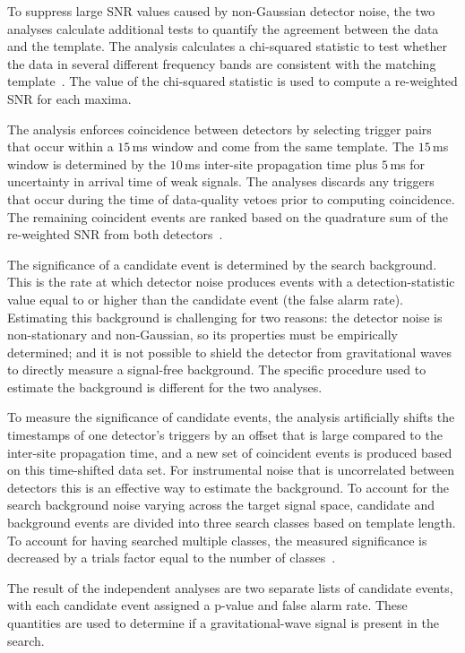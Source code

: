 To suppress large SNR values caused by non-Gaussian detector noise, the two
analyses calculate additional tests to quantify the agreement between the data
and the template.  The \pycbc{} analysis calculates a chi-squared statistic to
test whether the data in several different frequency bands are consistent with
the matching template~\cite{Allen:2004gu}.  The value of the chi-squared
statistic is used to compute a re-weighted SNR for each maxima.

The \pycbc{} analysis enforces coincidence between detectors by selecting trigger pairs
that occur within a $15\,$ms window and come from the same template.  The
$15\,$ms window is determined by the $10\,$ms inter-site propagation time plus
$5\,$ms for uncertainty in arrival time of weak signals.  The \pycbc{}
analyses discards any triggers that occur during the time of data-quality
vetoes prior to computing coincidence. The remaining coincident events are
ranked based on the quadrature sum of the re-weighted SNR from both
detectors~\cite{Usman:2015kfa}.

The significance of a candidate event is determined by the search background.
This is the rate at which detector noise produces events with a
detection-statistic value equal to or higher than the candidate event (the
false alarm rate).  Estimating this background is challenging for two reasons:
the detector noise is non-stationary and non-Gaussian, so its properties must
be empirically determined; and it is not possible to shield the detector from
gravitational waves to directly measure a signal-free background.  The
specific procedure used to estimate the background is different for the two
analyses.

To measure the significance of candidate events, the \pycbc{} analysis
artificially shifts the time\-stamps of one detector's triggers by an offset
that is large compared to the inter-site propagation time, and a new set of
coincident events is produced based on this time-shifted data set. For
instrumental noise that is uncorrelated between detectors this is an effective
way to estimate the background.  To account for the search background noise
varying across the target signal space, candidate and background events are
divided into three search classes based on template length. To account for
having searched multiple classes, the measured significance is decreased by a
trials factor equal to the number of classes~\cite{Lyons:1900zz}.  

The result of the independent analyses are two separate lists of candidate
events, with each candidate event assigned a p-value and false
alarm rate. These quantities are used to determine if a gravitational-wave
signal is present in the search.


